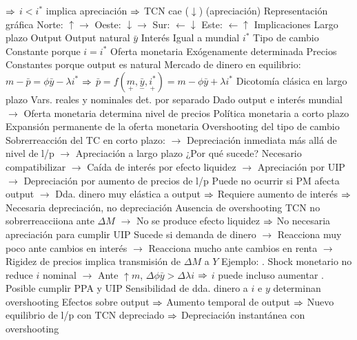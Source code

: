 \documentclass{nuevotema}
\begin{document}
\begin{esquemal}
				\4[] $\then$ $i < i^*$ implica apreciación
				\4[] $\then$ TCN cae ($\downarrow$) (apreciación)
				\4 Representación gráfica
				\4[] Norte: $\uparrow \rightarrow$
				\4[] Oeste: $\downarrow \rightarrow$
				\4[] Sur: $\leftarrow \downarrow$
				\4[] Este: $\leftarrow \uparrow$
				\4[] 
		\2 Implicaciones
			\3 Largo plazo
				\4 Output
				\4[] Output natural $\bar{y}$
				\4 Interés
				\4[] Igual a mundial $i^*$
				\4 Tipo de cambio
				\4[] Constante porque $i=i^*$
				\4 Oferta monetaria
				\4[] Exógenamente determinada
				\4 Precios
				\4[] Constantes porque output es natural
				\4[] Mercado de dinero en equilibrio:
				\4[] $m - \bar{p} = \phi \bar{y} - \lambda i^*$
				\4[] $\then$ $\bar{p} = f(\underset{+}{m}, \underset{-}{\bar{y}}, \underset{+}{i^*}) = m - \phi \bar{y} + \lambda i^*$
				\4[$\then$] Dicotomía clásica en largo plazo
				\4[] Vars. reales y nominales det. por separado
				\4[] Dado output e interés mundial
				\4[] $\to$ Oferta monetaria determina nivel de precios
			\3 Política monetaria a corto plazo
				\4 Expansión permanente de la oferta monetaria
				\4 
				\4 Overshooting del tipo de cambio
				\4[] Sobrerreacción del TC en corto plazo:
				\4[] $\to$ Depreciación inmediata más allá de nivel de l/p
				\4[] $\to$ Apreciación a largo plazo
				\4[] ¿Por qué sucede?
				\4[] Necesario compatibilizar
				\4[] $\to$ Caída de interés por efecto liquidez
				\4[] $\to$ Apreciación por UIP
				\4[] $\to$ Depreciación por aumento de precios de l/p
				\4[] Puede no ocurrir si PM afecta output
				\4[] $\to$ Dda. dinero muy elástica a output
				\4[] $\then$ Requiere aumento de interés
				\4[] $\then$ Necesaria depreciación, no depreciación
				\4 Ausencia de overshooting
				\4[] TCN no sobrerreacciiona ante $\Delta M$
				\4[] $\to$ No se produce efecto liquidez
				\4[] $\then$ No necesaria apreciación para cumplir UIP
				\4[] Sucede si demanda de dinero
				\4[] $\to$ Reacciona muy poco ante cambios en interés
				\4[] $\to$ Reacciona mucho ante cambios en renta
				\4[] $\to$ Rigidez de precios implica transmisión de $\Delta M$ a $Y$
				\4[] Ejemplo:
				. Shock monetario no reduce $i$ nominal
				\4[] $\to$ Ante $\uparrow m$, $\Delta \phi \bar{y} > \Delta \lambda i$
				\4[] $\then$ $i$ puede incluso aumentar
				. Posible cumplir PPA y UIP
				\4[$\then$] Sensibilidad de dda. dinero a $i$ e $y$ determinan overshooting
				\4 Efectos sobre output
				\4[] $\then$ Aumento temporal de output
				\4[] $\then$ Nuevo equilibrio de l/p con TCN depreciado
				\4[] $\then$ Depreciación instantánea con overshooting

\end{esquemal}
\end{document}

